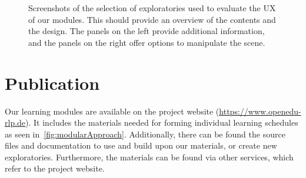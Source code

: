 \begin{figure}[t!b]
	\centering
	\captionsetup{labelfont=bf,textfont=it}
	\caption{Screenshots of the selection of exploratories used to evaluate the UX of our modules. This should provide an overview of the contents and the design. The panels on the left provide additional information, and the panels on the right offer options to manipulate the scene.}
	\label{fig:uxEval}
\end{figure}
\section{Publication\label{sec:publication}}
Our learning modules are available on the project website (\href{https://openedu-rlp.de/edu-sharing/components/collections?id=fd3957ef-80aa-4440-8956-c1d0d738c629}{https://www.openedu-rlp.de}). It includes the materials needed for forming individual learning schedules as seen in~\autoref{fig:modularApproach}. Additionally, there can be found the source files and documentation to use and build upon our materials, or create new exploratories. Furthermore, the materials can be found via other services, which refer to the project website. %


